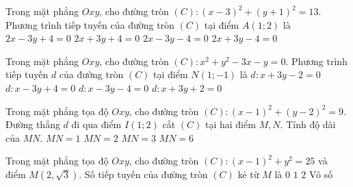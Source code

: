 \begin{ex}%
	Trong mặt phẳng $Oxy$, cho đường tròn $(C):(x-3)^2+(y+1)^2=13$. Phương trình tiếp tuyến của đường tròn $(C)$ tại điểm $A\left(1;2\right)$ là
	\choice
	{\True $2x-3y+4=0$}
	{$2x+3y+4=0$}
	{$2x-3y-4=0$}
	{$2x+3y-4=0$}
\end{ex}


\begin{ex}%
	Trong mặt phẳng $Oxy$, cho đường tròn $(C):x^2+y^2-3x-y=0$. Phương trình tiếp tuyến $d$ của đường tròn $(C)$ tại điểm $N\left(1;-1\right)$ là
	\choice
	{$d\colon x+3y-2=0$}
	{$d \colon x-3y+4=0$}
	{$d\colon x-3y-4=0$}
	{\True $d\colon x+3y+2=0$}
\end{ex}

\begin{ex}%
	Trong mặt phẳng tọa độ $Oxy$, cho đường tròn $(C)\colon (x-1)^2+(y-2)^2=9$. Đường thẳng $d$ đi qua điểm $I(1;2)$ cắt $(C)$ tại hai điểm $M ,N$. Tính độ dài của $MN$.
	\choice
	{$MN = 1$}
	{$MN = 2$}
	{$MN = 3$}
	{\True $MN = 6$}
\end{ex}

\begin{ex}%
	Trong mặt phẳng tọa độ $Oxy$, cho đường tròn $(C) \colon (x-1)^2 + y^2=25$ và điểm $M(2,\sqrt{3})$. Số tiếp tuyến của đường tròn $(C)$ kẻ từ $M$ là
	\choice
	{\True $0$}
	{$1$}
	{$2$}
	{Vô số}
\end{ex}

